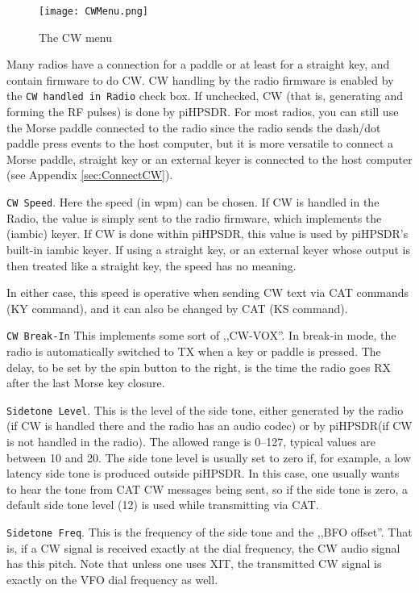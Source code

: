 \documentclass[12pt]{book}
\def\rett#1{\texttt{\color{red}#1}}
\def\pH{pi\-HPSDR\xspace}
\begin{document}
\begin{figure}[ht]
\center
\texttt{[image: CWMenu.png]}
\caption{The CW menu}
\label{fig:CWMenu}
\end{figure}

Many radios have a connection for a paddle or at least for
a straight key, and contain firmware to do CW. CW handling by
the radio firmware is enabled by the \rett{CW handled in Radio}
check box. If unchecked, CW (that is, generating and forming
the RF pulses) is done by \pH. For most radios, you can
still use the Morse paddle connected to the radio since the
radio sends the dash/dot paddle press events to the host
computer, but it is more versatile to connect
a Morse paddle, straight key or an external keyer is connected
to the host computer (see Appendix \ref{sec:ConnectCW}).

\rett{CW Speed}. Here the speed (in wpm) can be chosen. If CW is
handled in the Radio, the value is simply sent to the radio firmware,
which implements the (iambic) keyer. If CW is done within \pH,
this value is used by \pH's built-in iambic keyer. If using
a straight key, or an external keyer whose output is then treated
like a straight key, the speed has no meaning.

In either case, this speed is operative when sending CW text via
CAT commands (KY command), and it can also be changed by CAT
(KS command).

\rett{CW Break-In} This implements some sort of ,,CW-VOX''. In
break-in mode, the radio is automatically switched to TX when
a key or paddle is pressed. The delay, to be set by the spin
button to the right, is the time the radio goes RX after the
last Morse key closure.

\rett{Sidetone Level}. This is the level of the side tone,
either generated by the radio (if CW is handled there and the radio
has an audio codec) or
by \pH (if CW is not handled in the radio). The allowed range
is 0--127, typical values are between 10 and 20. The side tone level
is usually set to zero if, for example, a low latency side tone is
produced outside \pH. In this case, one usually wants to hear
the tone from CAT CW messages being sent, so if the side tone is
zero, a default side tone level (12) is used while transmitting
via CAT.

\rett{Sidetone Freq}. This is the frequency of the side tone and the
,,BFO offset''. That is, if a CW signal is received exactly at the
dial frequency, the CW audio signal has this pitch. Note that unless
one uses XIT, the transmitted CW signal is exactly on the VFO dial
frequency as well.
\end{document}

